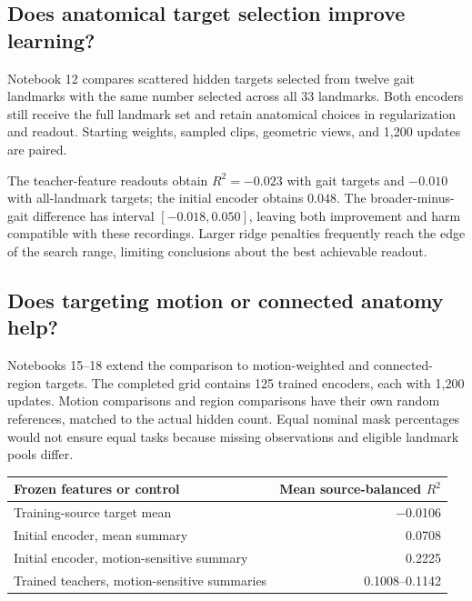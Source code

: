 \documentclass{article}
\begin{document}
\subsection{Does anatomical target selection improve learning?}\label{does-anatomical-target-selection-improve-learning}

Notebook 12 compares scattered hidden targets selected from twelve gait landmarks with the same number selected across all 33 landmarks. Both encoders still receive the full landmark set and retain anatomical choices in regularization and readout. Starting weights, sampled clips, geometric views, and 1,200 updates are paired.

The teacher-feature readouts obtain \(R^2=-0.023\) with gait targets and \(-0.010\) with all-landmark targets; the initial encoder obtains \(0.048\). The broader-minus-gait difference has interval \([-0.018,0.050]\), leaving both improvement and harm compatible with these recordings. Larger ridge penalties frequently reach the edge of the search range, limiting conclusions about the best achievable readout.

\subsection{Does targeting motion or connected anatomy help?}\label{does-targeting-motion-or-connected-anatomy-help}

Notebooks 15--18 extend the comparison to motion-weighted and connected-region targets. The completed grid contains 125 trained encoders, each with 1,200 updates. Motion comparisons and region comparisons have their own random references, matched to the actual hidden count. Equal nominal mask percentages would not ensure equal tasks because missing observations and eligible landmark pools differ.

\begin{table}[htbp]
\centering
\small
\begin{tabular}{@{}lr@{}}
\toprule\noalign{}
Frozen features or control & Mean source-balanced \(R^2\) \\
\midrule\noalign{}

Training-source target mean & −0.0106 \\
Initial encoder, mean summary & 0.0708 \\
Initial encoder, motion-sensitive summary & 0.2225 \\
Trained teachers, motion-sensitive summaries & 0.1008--0.1142 \\
\bottomrule
\end{tabular}
\end{table}
\end{document}
